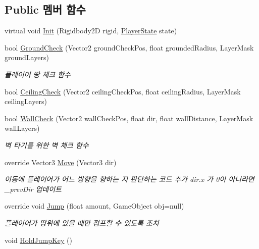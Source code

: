 \subsection*{Public 멤버 함수}
\begin{DoxyCompactItemize}
\item 
virtual void \mbox{\hyperlink{class_player_movement_a104a453051ca7b60d6862e4deb7475b4}{Init}} (Rigidbody2D rigid, \mbox{\hyperlink{class_player_state}{Player\+State}} state)
\item 
bool \mbox{\hyperlink{class_player_movement_a957f2e09268831052dbd00a9e8e4fa70}{Ground\+Check}} (Vector2 ground\+Check\+Pos, float grounded\+Radius, Layer\+Mask ground\+Layers)
\begin{DoxyCompactList}\small\item\em 플레이어 땅 체크 함수 \end{DoxyCompactList}\item 
bool \mbox{\hyperlink{class_player_movement_a6f9b40c6b4bb2fcb47c3c0b8f17a81b8}{Ceiling\+Check}} (Vector2 ceiling\+Check\+Pos, float ceiling\+Radius, Layer\+Mask ceiling\+Layers)
\item 
bool \mbox{\hyperlink{class_player_movement_ad878c661ddfc72890b353a01943f9161}{Wall\+Check}} (Vector2 wall\+Check\+Pos, float dir, float wall\+Distance, Layer\+Mask wall\+Layers)
\begin{DoxyCompactList}\small\item\em 벽 타기를 위한 벽 체크 함수 \end{DoxyCompactList}\item 
override Vector3 \mbox{\hyperlink{class_player_movement_a94c480a9aa5629d78b5fd16d9a814bb7}{Move}} (Vector3 dir)
\begin{DoxyCompactList}\small\item\em 이동에 플레이어가 어느 방향을 향하는 지 판단하는 코드 추가 dir.\+x 가 0이 아니라면 \+\_\+prev\+Dir 업데이트 \end{DoxyCompactList}\item 
override void \mbox{\hyperlink{class_player_movement_a347d6bcd5389bbc6b115c2bdf33e8f29}{Jump}} (float amount, Game\+Object obj=null)
\begin{DoxyCompactList}\small\item\em 플레이어가 땅위에 있을 때만 점프할 수 있도록 조치 \end{DoxyCompactList}\item 
void \mbox{\hyperlink{class_player_movement_af1a6cc9394844b2ef84773900f315fb9}{Hold\+Jump\+Key}} ()
\item 

\end{DoxyCompactItemize}
